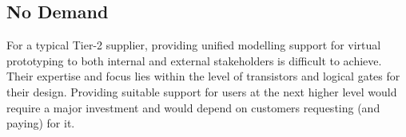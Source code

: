



\subsection{No Demand}
For a typical Tier-2 supplier, providing unified modelling support for virtual prototyping to both internal and external stakeholders is difficult to achieve. Their expertise and focus lies within the level of transistors and logical gates for their design. Providing suitable support for users at the next higher level would require a major investment and would depend on customers requesting (and paying) for it.

